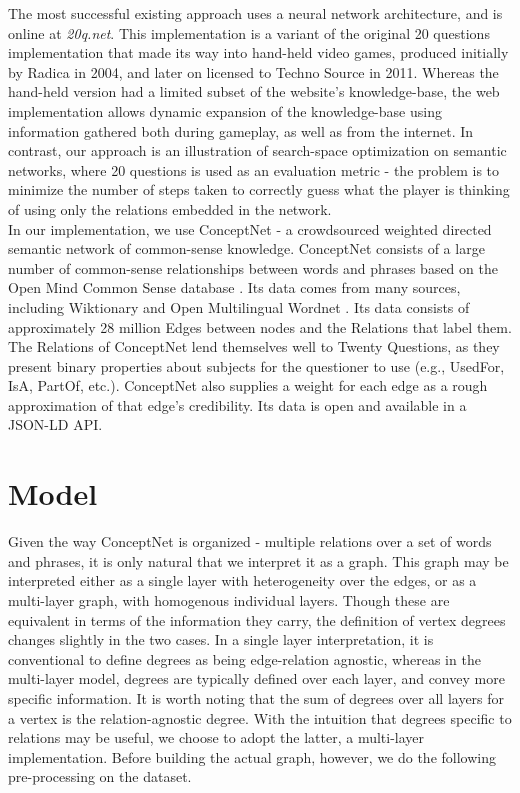 \documentclass[letterpaper]{article} %
\begin{document}
The most successful existing approach uses a neural network architecture, and is online at \textit{20q.net}. This implementation is a variant of the original 20 questions implementation that made its way into hand-held video games, produced initially by Radica in 2004, and later on licensed to Techno Source in 2011. Whereas the hand-held version had a limited subset of the website's knowledge-base, the web implementation allows dynamic expansion of the knowledge-base using information gathered both during gameplay, as well as from the internet. In contrast, our approach is an illustration of search-space optimization on semantic networks, where 20 questions is used as an evaluation metric - the problem is to minimize the number of steps taken to correctly guess what the player is thinking of using only the relations embedded in the network.\\

In our implementation, we use ConceptNet - a crowdsourced weighted directed semantic network of common-sense knowledge. ConceptNet \cite{Liu2004} consists of a large number of common-sense relationships between words and phrases based on the Open Mind Common Sense database \cite{10.1007/3-540-36124-3_77}. Its data comes from many sources, including Wiktionary and Open Multilingual Wordnet \cite{bond2013linking}. Its data consists of approximately 28 million Edges between nodes and the Relations that label them. The Relations of ConceptNet lend themselves well to Twenty Questions, as they present binary properties about subjects for the questioner to use (e.g., UsedFor, IsA, PartOf, etc.). ConceptNet also supplies a weight for each edge as a rough approximation of that edge’s credibility. Its data is open and available in a JSON-LD API.

\section{Model}

Given the way ConceptNet is organized - multiple relations over a set of words and phrases, it is only natural that we interpret it as a graph. This graph may be interpreted either as a single layer with heterogeneity over the edges, or as a multi-layer graph, with homogenous individual layers. Though these are equivalent in terms of the information they carry, the definition of vertex degrees changes slightly in the two cases. In a single layer interpretation, it is conventional to define degrees as being edge-relation agnostic, whereas in the multi-layer model, degrees are typically defined over each layer, and convey more specific information. It is worth noting that the sum of degrees over all layers for a vertex is the relation-agnostic degree. With the intuition that degrees specific to relations may be useful, we choose to adopt the latter, a multi-layer implementation. Before building the actual graph, however, we do the following pre-processing on the dataset.
\end{document}
